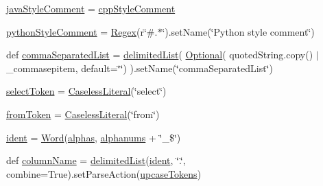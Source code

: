 \begin{DoxyCompactItemize}
\item 
\hyperlink{namespacesetuptools_1_1__vendor_1_1pyparsing_a487ed64064060d0bab24feee5687eff8}{java\+Style\+Comment} = \hyperlink{namespacesetuptools_1_1__vendor_1_1pyparsing_a273c8ece64619011bdeff7b7733e6a84}{cpp\+Style\+Comment}
\item 
\hyperlink{namespacesetuptools_1_1__vendor_1_1pyparsing_a465e4067ae1dfc5b890c7585111c688b}{python\+Style\+Comment} = \hyperlink{classsetuptools_1_1__vendor_1_1pyparsing_1_1_regex}{Regex}(r\char`\"{}\#.$\ast$\char`\"{}).set\+Name(\char`\"{}Python style comment\char`\"{})
\item 
def \hyperlink{namespacesetuptools_1_1__vendor_1_1pyparsing_a81decc4ce7b7bad938c5dd43adb6d24c}{comma\+Separated\+List} = \hyperlink{namespacesetuptools_1_1__vendor_1_1pyparsing_a1989367af98a82b6d6b4860de6b9f2f1}{delimited\+List}( \hyperlink{classsetuptools_1_1__vendor_1_1pyparsing_1_1_optional}{Optional}( quoted\+String.\+copy() $\vert$ \+\_\+commasepitem, default=\char`\"{}\char`\"{}) ).set\+Name(\char`\"{}comma\+Separated\+List\char`\"{})
\item 
\hyperlink{namespacesetuptools_1_1__vendor_1_1pyparsing_ae36ec6cbf695502e2954a44811435ee7}{select\+Token} = \hyperlink{classsetuptools_1_1__vendor_1_1pyparsing_1_1_caseless_literal}{Caseless\+Literal}(\char`\"{}select\char`\"{})
\item 
\hyperlink{namespacesetuptools_1_1__vendor_1_1pyparsing_a3756a708bb51760c5ef7ffda1d6cc892}{from\+Token} = \hyperlink{classsetuptools_1_1__vendor_1_1pyparsing_1_1_caseless_literal}{Caseless\+Literal}(\char`\"{}from\char`\"{})
\item 
\hyperlink{namespacesetuptools_1_1__vendor_1_1pyparsing_abc961dfe3e230ca908d9304d7786a03b}{ident} = \hyperlink{classsetuptools_1_1__vendor_1_1pyparsing_1_1_word}{Word}(\hyperlink{namespacesetuptools_1_1__vendor_1_1pyparsing_aa1e79ef7e5382a4dc4dcc6ce37ef91e9}{alphas}, \hyperlink{namespacesetuptools_1_1__vendor_1_1pyparsing_a9441041befe04d1efb091151a019e0b4}{alphanums} + \char`\"{}\+\_\+\$\char`\"{})
\item 
def \hyperlink{namespacesetuptools_1_1__vendor_1_1pyparsing_a854cda2a40f683747cd518322d7925f6}{column\+Name} = \hyperlink{namespacesetuptools_1_1__vendor_1_1pyparsing_a1989367af98a82b6d6b4860de6b9f2f1}{delimited\+List}(\hyperlink{namespacesetuptools_1_1__vendor_1_1pyparsing_abc961dfe3e230ca908d9304d7786a03b}{ident}, \char`\"{}.\char`\"{}, combine=True).set\+Parse\+Action(\hyperlink{namespacesetuptools_1_1__vendor_1_1pyparsing_a9c65499f07d8593273a03109246a0065}{upcase\+Tokens})

\end{DoxyCompactItemize}
